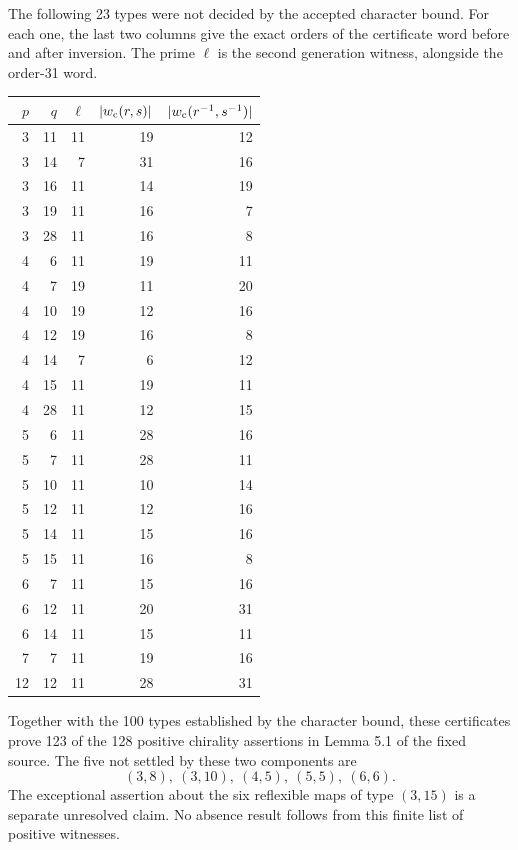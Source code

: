 The following 23 types were not decided by the accepted character bound.
For each one, the last two columns give the exact orders of the certificate
word before and after inversion. The prime $\ell$ is the second generation
witness, alongside the order-31 word.
\begin{center}\begin{tabular}{rrrrr}\toprule
$p$&$q$&$\ell$&$|w_{\rm c}(r,s)|$&$|w_{\rm c}(r^{-1},s^{-1})|$\\\midrule
3&11&11&19&12\\
3&14&7&31&16\\
3&16&11&14&19\\
3&19&11&16&7\\
3&28&11&16&8\\
4&6&11&19&11\\
4&7&19&11&20\\
4&10&19&12&16\\
4&12&19&16&8\\
4&14&7&6&12\\
4&15&11&19&11\\
4&28&11&12&15\\
5&6&11&28&16\\
5&7&11&28&11\\
5&10&11&10&14\\
5&12&11&12&16\\
5&14&11&15&16\\
5&15&11&16&8\\
6&7&11&15&16\\
6&12&11&20&31\\
6&14&11&15&11\\
7&7&11&19&16\\
12&12&11&28&31\\
\bottomrule\end{tabular}\end{center}
Together with the 100 types established by the character bound, these
certificates prove 123 of the 128 positive chirality assertions in
Lemma 5.1 of the fixed source. The five not settled by these two components are
\[ (3,8),\ (3,10),\ (4,5),\ (5,5),\ (6,6). \]
The exceptional assertion about the six reflexible maps of type $(3,15)$
is a separate unresolved claim. No absence result follows from this finite
list of positive witnesses.
